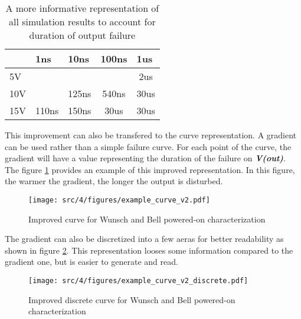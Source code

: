 \begin{table}[!h]
\centering
\begin{tabular}{@{}lcccc@{}}
\toprule
    & \multicolumn{1}{l}{1ns}      & \multicolumn{1}{l}{10ns}     & \multicolumn{1}{l}{100ns}    & \multicolumn{1}{l}{1us}     \\ \midrule
5V  & {\color[HTML]{32CB00} }      & {\color[HTML]{32CB00} }      & {\color[HTML]{32CB00} }      & {\color[HTML]{F56B00} 2us}  \\
10V & {\color[HTML]{32CB00} }      & {\color[HTML]{00D2CB} 125ns} & {\color[HTML]{F8A102} 540ns} & {\color[HTML]{FE0000} 30us} \\
15V & {\color[HTML]{00D2CB} 110ns} & {\color[HTML]{FFCB2F} 150ns} & {\color[HTML]{FE0000} 30us}  & {\color[HTML]{FE0000} 30us} \\ \bottomrule
\end{tabular}
\caption{A more informative representation of all simulation results to account for duration of output failure}
\label{simulation-results-bis}
\end{table}

This improvement can also be transfered to the curve representation.
A gradient can be used rather than a simple failure curve.
For each point of the curve, the gradient will have a value representing the duration of the failure on \textbf{\textit{V(out)}}.
The figure \ref{wb_cz_curve_example_v2} provides an example of this improved representation.
In this figure, the warmer the gradient, the longer the output is disturbed.

\begin{figure}[!h]
  \centering
  \texttt{[image: src/4/figures/example\_curve\_v2.pdf]}
  \caption{Improved curve for Wunsch and Bell powered-on characterization}
  \label{wb_cz_curve_example_v2}
\end{figure}

The gradient can also be discretized into a few aeras for better readability as shown in figure \ref{wb_cz_curve_example_v2_discrete}.
This representation looses some information compared to the gradient one, but is easier to generate and read.

\begin{figure}[!h]
  \centering
  \texttt{[image: src/4/figures/example\_curve\_v2\_discrete.pdf]}
  \caption{Improved discrete curve for Wunsch and Bell powered-on characterization}
  \label{wb_cz_curve_example_v2_discrete}
\end{figure}

